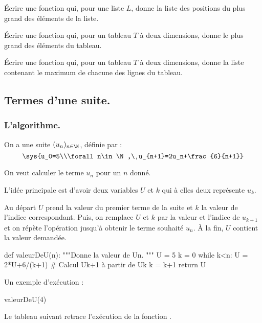 \documentclass[french,11pt,twoside]{VcCours}
\begin{document}
\begin{Exercice}{}
Écrire une fonction  qui, pour une liste $L$,
donne la liste des positions du plus grand des éléments de la liste.
\end{Exercice}

\begin{Exercice}{}
Écrire une fonction  qui, pour un
tableau $T$ à deux dimensions, donne le plus grand des éléments du tableau.
\end{Exercice}

\begin{Exercice}{}
Écrire une fonction  qui, pour un
tableau $T$ à deux dimensions, donne la liste contenant le maximum de chacune
des lignes du tableau.
\end{Exercice}

\newpage
\subsection{Termes d'une suite.}
\subsubsection{L'algorithme.}
On a une suite $(u_n)_{n\in\N}$, définie par :
\[\sys{u_0=5\\\forall n\in\N,\ u_{n+1}=2u_n+\frac{6}{n+1}}\]

On veut calculer le terme $u_n$ pour un $n$ donné.

L'idée principale est d'avoir deux variables $U$ et $k$ qui à elles deux
représente $u_k$.

Au départ $U$ prend la valeur du premier terme de la suite et $k$ la valeur de
l'indice correspondant. Puis, on remplace $U$ et $k$ par la valeur et l'indice
de $u_{k+1}$ et on répète l'opération jusqu'à obtenir le terme souhaité $u_n$.
À la fin, $U$ contient la valeur demandée.

\begin{Python}
def valeurDeU(n):
    """Donne la valeur de Un.
    """
    U = 5
    k = 0
    while k<n:
        U = 2*U+6/(k+1) # Calcul Uk+1 à partir de Uk
        k = k+1
    return U
\end{Python}

Un exemple d'exécution :
\begin{Python*}
valeurDeU(4)
\end{Python*}

Le tableau suivant retrace l'exécution de la fonction .
\end{document}
